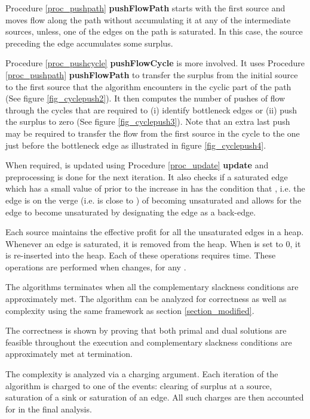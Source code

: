 \documentclass[11pt]{article}
\newcounter{rem}
\begin{document}
Procedure \ref{proc_pushpath} {\bf pushFlowPath} starts with the first source and
moves flow along the path without accumulating it at any of the intermediate sources, unless,
one of the edges on the path is saturated. In this case, the source preceding the edge
accumulates some surplus.

Procedure \ref{proc_pushcycle} {\bf pushFlowCycle} is more involved. It uses 
Procedure \ref{proc_pushpath} {\bf pushFlowPath} to transfer the surplus from the initial source
to the first source that the algorithm encounters in the cyclic part of the path 
(See figure \ref{fig_cyclepush2}).
It then computes the number of pushes of flow through the cycles that are required
to (i) identify bottleneck edges or (ii) push the surplus to zero
(See figure \ref{fig_cyclepush3}).
Note that an extra 
last push may be required 
to transfer the flow from the first source in the cycle to the one just before the 
bottleneck edge as illustrated in figure \ref{fig_cyclepush4}.

When required,  is updated using Procedure \ref{proc_update} {\bf update} and 
preprocessing is done for the next iteration. It also checks if a  saturated edge
  which has a small value of   prior to the
increase in  has the condition
that ,
i.e. the edge is on the verge (i.e.  is close to ) 
of becoming unsaturated and 
allows for the edge to become unsaturated by designating the edge
as a back-edge. 

Each source maintains the effective profit  for all the 
unsaturated edges in a heap. Whenever an edge is saturated, it is removed 
from the heap. When  is set to 0, it is re-inserted into the
heap. Each of these operations requires  time. These operations are performed
when  changes, for any . 

The algorithms terminates when all the complementary slackness conditions are approximately 
met. The algorithm can be analyzed for correctness as well as complexity using the same 
framework as section \ref{section_modified}.

The correctness is shown by proving that both primal and dual solutions are feasible throughout
the execution and complementary slackness conditions are approximately met at termination.

The complexity is analyzed via a charging argument. Each iteration of the algorithm is
charged to one of the events: clearing of surplus at a source, saturation of a sink or 
saturation of an edge. All such charges are then accounted for in the
final analysis.
\end{document}
